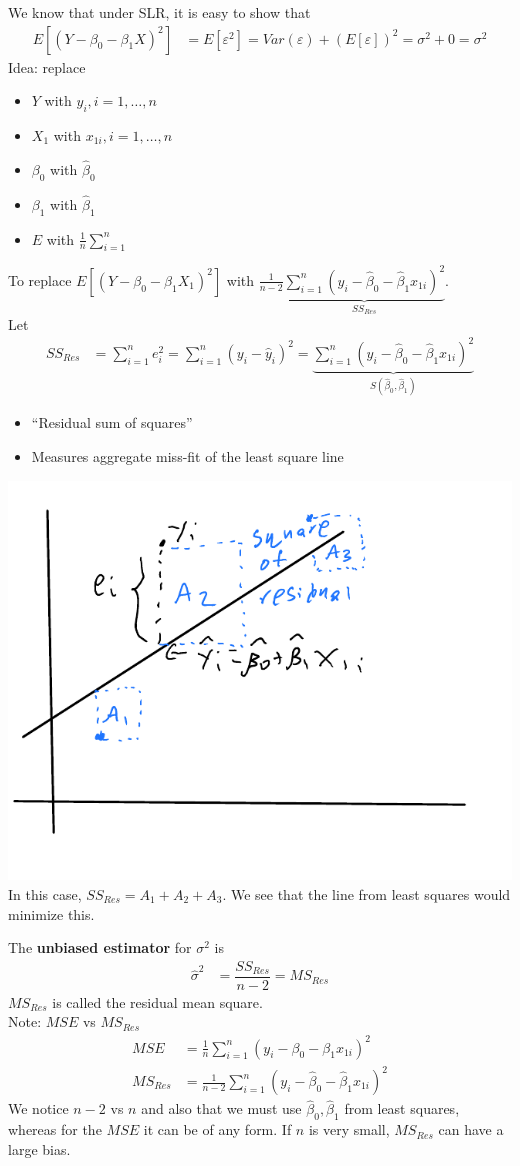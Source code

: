 \documentclass[12 pt]{article}
\begin{document}
We know that under SLR, it is easy to show that
\begin{align*}
  E[(Y - \beta_0 - \beta_1 X)^2] & = E[\varepsilon^2] = Var(\varepsilon) + (E[\varepsilon])^2
                                   = \sigma^2 + 0 = \sigma^2
\end{align*}
Idea: replace
\begin{itemize}
\item $Y$ with $y_i, i =1, \ldots, n$
\item $X_1$ with $x_{1i}, i = 1, \ldots, n$
\item $\beta_0$ with $\hat{\beta}_0$
\item $\beta_1$ with $\hat{\beta}_1$
\item $E$ with $\frac{1}{n} \sum_{i=1}^n$
\end{itemize}
To replace $E[(Y - \beta_0 - \beta_1 X_1)^2]$ with
$\frac{1}{n-2}\underbrace{\sum_{i=1}^n (y_i - \hat{\beta}_0 - \hat{\beta}_1
x_{1i})^2}_{SS_{Res}}$.
\\ Let
\begin{align*}
  SS_{Res} & = \sum_{i=1}^n e_i^2 = \sum_{i=1}^n (y_i - \hat{y}_i)^2 = \underbrace{\sum_{i=1}^n (y_i - \hat{\beta}_0 - \hat{\beta}_1x_{1i})^2}_{S(\hat{\beta}_0, \hat{\beta}_1)}
\end{align*}
\begin{itemize}
\item ``Residual sum of squares''
\item Measures aggregate miss-fit of the least square line
\end{itemize}
\includegraphics[width=.6\textwidth]{13.pdf}
\\ In this case, $SS_{Res} = A_1 + A_2 + A_3$. We see that the line
from least squares would minimize this.

The \textbf{unbiased estimator} for $\sigma^2$ is
\begin{align*}
  \hat{\sigma}^2 & = \dfrac{SS_{Res}}{n-2} = MS_{Res}
\end{align*}
$MS_{Res}$ is called the residual mean square.
\\ Note: $MSE$ vs $MS_{Res}$
\begin{align*}
  MSE & = \frac{1}{n} \sum_{i=1}^n (y_i - \beta_0 - \beta_1 x_{1i})^2
  \\ MS_{Res} & = \frac{1}{n-2} \sum_{i=1}^n (y_i - \hat{\beta}_0 - \hat{\beta}_1 x_{1i})^2
\end{align*}
We notice $n-2$ vs $n$ and also that we must use $\hat{\beta}_0,
\hat{\beta}_1$ from least squares, whereas for the $MSE$ it can be of
any form. If $n$ is very small, $MS_{Res}$ can have a large bias.
\end{document}
